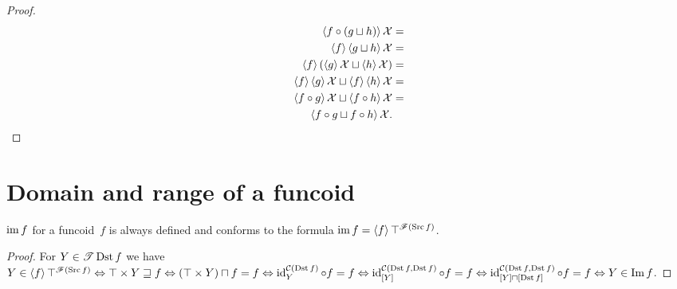 \begin{proof}
~
\begin{align*}
\left\langle f\circ(g\sqcup h)\right\rangle\mathcal{X} & =\\
\left\langle f\right\rangle\left\langle g\sqcup h\right\rangle\mathcal{X} & =\\
\left\langle f\right\rangle(\left\langle g\right\rangle\mathcal{X}\sqcup\left\langle h\right\rangle\mathcal{X}) & =\\
\left\langle f\right\rangle\left\langle g\right\rangle\mathcal{X}\sqcup\left\langle f\right\rangle\left\langle h\right\rangle\mathcal{X} & =\\
\left\langle f\circ g\right\rangle\mathcal{X}\sqcup\left\langle f\circ h\right\rangle\mathcal{X} & =\\
\left\langle f\circ g\sqcup f\circ h\right\rangle\mathcal{X}.
\end{align*}

\end{proof}

\section{Domain and range of a funcoid}

\begin{thm}
$\operatorname{im} f$ for a funcoid~$f$ is always defined
and conforms to the formula
$\operatorname{im} f=\left\langle f\right\rangle\top^{\mathscr{F}(\operatorname{Src} f)}$.
\end{thm}

\begin{proof}
For $Y\in\mathscr{T}\operatorname{Dst} f$ we have
$Y\in\left\langle f\right\rangle\top^{\mathscr{F}(\operatorname{Src} f)}\Leftrightarrow
\top\times Y\sqsupseteq f\Leftrightarrow
(\top\times Y)\sqcap f=f\Leftrightarrow
\operatorname{id}^{\mathcal{C}(\operatorname{Dst} f)}_Y \circ f = f
\Leftrightarrow
\operatorname{id}^{\mathcal{C}(\operatorname{Dst} f,\operatorname{Dst} f)}_{[Y]} \circ f = f
\Leftrightarrow
\operatorname{id}^{\mathcal{C}(\operatorname{Dst} f,\operatorname{Dst} f)}_{[Y]\sqcap[\operatorname{Dst} f]} \circ f = f \Leftrightarrow
Y\in\operatorname{Im}f$.
\end{proof}

